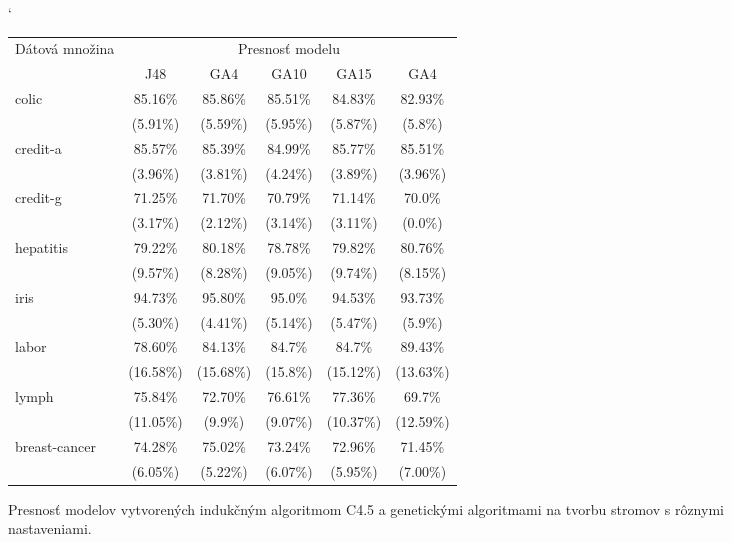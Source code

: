 \begin{figure}[h]
\catcode`
\centering 
\newcommand\T{\rule{0pt}{2.6ex}}       %
\newcommand\B{\rule[-1.2ex]{0pt}{0pt}} %
\begin{tabular}{|l||c|c|c|c|c||}
\hline \multirow{2}{*}{Dátová množina} & \multicolumn{5}{|c||}{Presnosť modelu} \\ 
\cline{2-6} & J48 & GA4 & GA10 & GA15 & GA4 \\
\hline
\hline \multirow{2}{*}{colic} & 85.16\% & 85.86\% & 85.51\% & 84.83\% & 82.93\% \T\\[-1.5ex]
& \tiny (5.91\%) & \tiny (5.59\%) & \tiny (5.95\%) & \tiny (5.87\%) & \tiny (5.8\%)\B\\
\hline \multirow{2}{*}{credit-a} & 85.57\% & 85.39\% & 84.99\% & 85.77\% & 85.51\% \T\\[-1.5ex]
& \tiny (3.96\%) & \tiny (3.81\%) & \tiny (4.24\%) & \tiny (3.89\%) & \tiny (3.96\%)\B\\
\hline \multirow{2}{*}{credit-g} & 71.25\% & 71.70\% & 70.79\% & 71.14\% & 70.0\%\T\\[-1.5ex]
& \tiny (3.17\%) & \tiny (2.12\%) & \tiny (3.14\%) & \tiny (3.11\%) & \tiny (0.0\%)\B\\
\hline \multirow{2}{*}{hepatitis} & 79.22\% & 80.18\% & 78.78\% & 79.82\% & 80.76\% \T\\[-1.5ex]
& \tiny (9.57\%) & \tiny (8.28\%) & \tiny (9.05\%) & \tiny (9.74\%) & \tiny (8.15\%)\B\\
\hline \multirow{2}{*}{iris} & 94.73\% & 95.80\% & 95.0\% & 94.53\% & 93.73\% \T\\[-1.5ex]
& \tiny (5.30\%) & \tiny (4.41\%) & \tiny (5.14\%) & \tiny (5.47\%) & \tiny (5.9\%)\B\\
\hline \multirow{2}{*}{labor} & 78.60\% & 84.13\% & 84.7\% & 84.7\% & 89.43\% \T\\[-1.5ex]
& \tiny (16.58\%) & \tiny (15.68\%) & \tiny (15.8\%) & \tiny (15.12\%) & \tiny (13.63\%)\B\\
\hline \multirow{2}{*}{lymph} & 75.84\% & 72.70\% & 76.61\% & 77.36\% & 69.7\% \T\\[-1.5ex]
& \tiny (11.05\%) & \tiny (9.9\%) & \tiny (9.07\%) & \tiny (10.37\%) & \tiny (12.59\%)\B\\
\hline \multirow{2}{*}{breast-cancer} & 74.28\% & 75.02\% & 73.24\% & 72.96\% & 71.45\% \T\\[-1.5ex]
& \tiny (6.05\%) & \tiny (5.22\%) & \tiny (6.07\%) & \tiny (5.95\%) & \tiny (7.00\%)\B\\
\hline
\end{tabular}
\caption{Presnosť modelov vytvorených indukčným algoritmom C4.5 a genetickými algoritmami na tvorbu stromov s rôznymi nastaveniami. }\label{fig:acc}
\end{figure}


